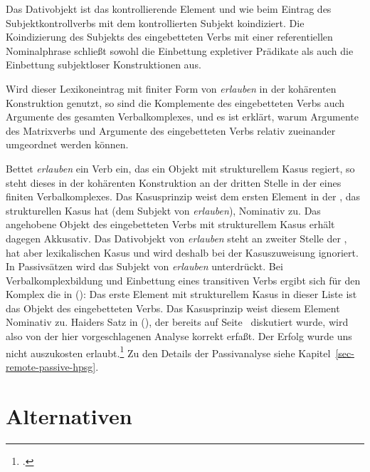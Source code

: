 {\noindent
Das Dativobjekt ist das kontrollierende Element und wie beim Eintrag des Subjektkontrollverbs
mit dem kontrollierten Subjekt koindiziert. Die Koindizierung des Subjekts des eingebetteten
Verbs mit einer referentiellen Nominalphrase schließt sowohl die Einbettung expletiver Prädikate
als auch die Einbettung subjektloser Konstruktionen aus.

Wird dieser Lexikoneintrag mit finiter Form von \emph{erlauben} in der kohärenten Konstruktion genutzt,
so sind die Komplemente des eingebetteten Verbs auch Argumente des gesamten Verbalkomplexes, und
es ist erklärt, warum Argumente des Matrixverbs und Argumente des eingebetteten Verbs
relativ zueinander umgeordnet werden können.

Bettet \emph{erlauben} ein Verb ein, das ein Objekt mit strukturellem Kasus regiert, so steht
dieses in der kohärenten Konstruktion an der dritten Stelle in der \subcatl eines finiten
Verbalkomplexes. Das Kasusprinzip weist dem ersten Element in der \subcatl, das strukturellen
Kasus hat (dem Subjekt von \emph{erlauben}), Nominativ zu. Das angehobene Objekt des eingebetteten Verbs
mit strukturellem Kasus erhält dagegen Akkusativ. Das Dativobjekt von \emph{erlauben} steht
an zweiter Stelle der \subcatl, hat aber lexikalischen Kasus und wird deshalb bei der Kasuszuweisung ignoriert.
In Passivsätzen wird das Subjekt von \emph{erlauben} unterdrückt. Bei Verbalkomplexbildung
und Einbettung eines transitiven Verbs ergibt sich für den Komplex die \subcatl in ():
\ea
\subcat {}
\z
Das erste Element mit strukturellem Kasus in dieser Liste ist das Objekt des eingebetteten
Verbs. Das Kasusprinzip weist diesem Element Nominativ zu. Haiders Satz in (),
der bereits auf Seite~\pageref{erfolg-auszukosten-erlaubt-kasus} diskutiert wurde,
wird also von der hier vorgeschlagenen Analyse korrekt erfaßt.
\ea
{}
Der Erfolg        wurde uns      nicht auszukosten erlaubt.\footnote{
        .%
}
\z
Zu den Details der Passivanalyse siehe Kapitel~\ref{sec-remote-passive-hpsg}.
%
%

\section{Alternativen}

\begin{comment}
\subsection{Einbettung von Verbalphrasen oder Sätzen in AcI-Konstruktionen}


\end{comment}}
